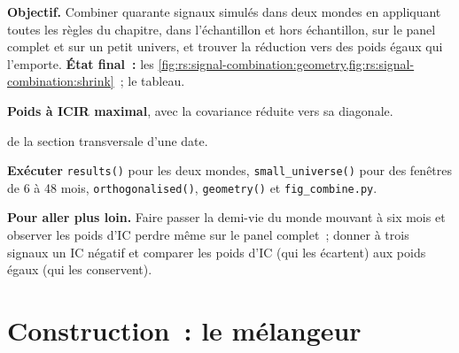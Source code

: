 \begin{tutorial}
\textbf{Objectif.} Combiner quarante signaux simulés dans deux mondes en appliquant toutes les règles du chapitre, dans l'échantillon et hors échantillon, sur le panel complet et sur un petit
univers, et trouver la réduction vers des poids égaux qui l'emporte. \textbf{État final~:}
les \cref{fig:rs:signal-combination:geometry,fig:rs:signal-combination:shrink}~; le tableau.
\begin{tutsteps}
\item \textbf{Poids à ICIR maximal}, avec la covariance réduite vers sa diagonale.
\label{lst:rs:signal-combination:icir}
\item \textbf{} de la section transversale d'une date.
\label{lst:rs:signal-combination:sym}
\item \textbf{Exécuter} \texttt{results()} pour les deux mondes, \texttt{small\_universe()} pour des fenêtres de 6 à 48 mois, \texttt{orthogonalised()},
\texttt{geometry()} et \texttt{fig\_combine.py}.
\end{tutsteps}
\textbf{Pour aller plus loin.} Faire passer la demi-vie du monde mouvant à six mois et observer les poids d'IC perdre même sur le panel complet~; donner à trois
signaux un IC négatif et comparer les poids d'IC (qui les écartent) aux poids égaux (qui les conservent).
\end{tutorial}

\section{Construction~: le mélangeur}\label{bld:rs:signal-combination:combine}

